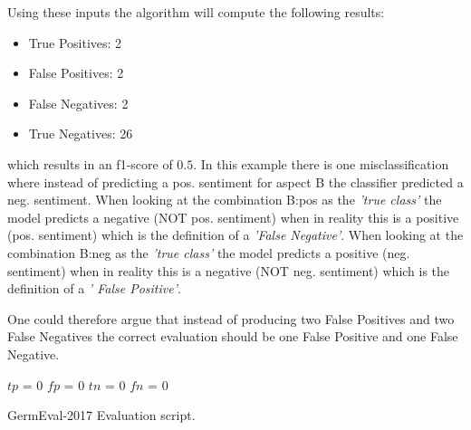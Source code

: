 Using these inputs the algorithm will compute the following results:

\begin{itemize}
	\item True Positives: 2
	\item False Positives: 2
	\item False Negatives: 2
	\item True Negatives: 26
\end{itemize}

which results in an f1-score of $0.5$. In this example there is one misclassification where instead of predicting a pos. sentiment for aspect B the classifier predicted a neg. sentiment. When looking at the combination B:pos as the \textit{'true class'} the model predicts a negative {(NOT pos. sentiment)} when in reality this is a positive {(pos. sentiment)} which is the definition of a \textit{'False Negative'}. When looking at the combination B:neg as the \textit{'true class'} the model predicts a positive {(neg. sentiment)} when in reality this is a negative {(NOT neg. sentiment)} which is the definition of a \textit{' False Positive'}.

One could therefore argue that instead of producing two False Positives and two False Negatives the correct evaluation should be one False Positive and one False Negative.


\begin{algorithm}
	
	
	
	$tp$ = 0
	$fp$ = 0
	$tn$ = 0	
	$fn$ = 0
	
	
	
	\caption{GermEval-2017 Evaluation script.}
	\label{algo:05_germeval}
\end{algorithm}



